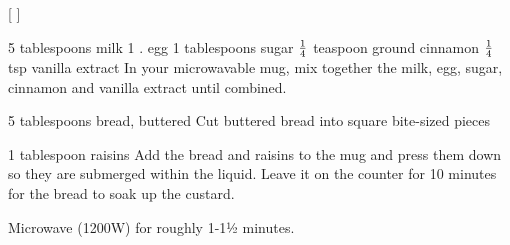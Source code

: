 
[
]

\begin{step}
5 tablespoons milk
1 . egg
1 tablespoons sugar
$\frac{1}{4}$ teaspoon ground cinnamon
$\frac{1}{4}$ tsp vanilla extract
\method
In your microwavable mug, mix together the milk, egg, sugar, cinnamon and vanilla extract until combined.
\end{step}

\begin{step}
5 tablespoons bread, buttered
\method
Cut buttered bread into square bite-sized pieces
\end{step}

\begin{step}
1 tablespoon raisins
\method
Add the bread and raisins to the mug and press them down so they are submerged within the liquid. Leave it on the counter for 10 minutes for the bread to soak up the custard.

Microwave (1200W) for roughly 1-1½ minutes.
\end{step}
